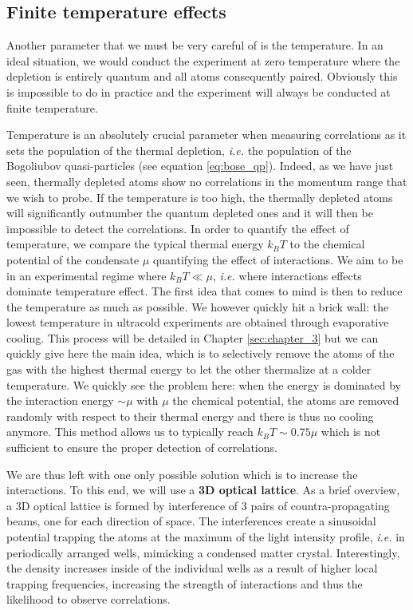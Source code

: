\subsection{Finite temperature effects}

Another parameter that we must be very careful of is the temperature. In an ideal situation, we would conduct the experiment at zero temperature where the depletion is entirely quantum and all atoms consequently \kmk paired. Obviously this is impossible to do in practice and the experiment will always be conducted at finite temperature.

Temperature is an absolutely crucial parameter when measuring \kmk correlations as it sets the population of the thermal depletion, {\it i.e.} the population of the Bogoliubov quasi-particles (see equation \ref{eq:bose_qp}). Indeed, as we have just seen, thermally depleted atoms show no \kmk correlations in the momentum range that we wish to probe. If the temperature is too high, the thermally depleted atoms will significantly outnumber the quantum depleted ones and it will then be impossible to detect the \kmk correlations. In order to quantify the effect of temperature, we compare the typical thermal energy $k_B T$ to the chemical potential of the condensate $\mu$ quantifying the effect of interactions. We aim to be in an experimental regime where $k_B T \ll \mu$, {\it i.e.} where interactions effects dominate temperature effect. The first idea that comes to mind is then to reduce the temperature as much as possible. We however quickly hit a brick wall: the lowest temperature in ultracold experiments are obtained through evaporative cooling. This process will be detailed in Chapter \ref{sec:chapter_3} but we can quickly give here the main idea, which is to selectively remove the atoms of the gas with the highest thermal energy to let the other thermalize at a colder temperature. We quickly see the problem here: when the energy is dominated by the interaction energy $\sim \mu$ with $\mu$ the chemical potential, the atoms are removed randomly with respect to their thermal energy and there is thus no cooling anymore. This method allows us to typically reach $k_B T \sim 0.75 \mu$ \cite{chang2016} which is not sufficient to ensure the proper detection of \kmk correlations.

We are thus left with one only possible solution which is to increase the interactions. To this end, we will use a \textbf{3D optical lattice}. As a brief overview, a 3D optical lattice is formed by interference of 3 pairs of countra-propagating beams, one for each direction of space. The interferences create a sinusoidal potential trapping the atoms at the maximum of the light intensity profile, {\it i.e.} in periodically arranged wells, mimicking a condensed matter crystal. Interestingly, the density increases inside of the individual wells as a result of higher local trapping frequencies, increasing the strength of interactions and thus the likelihood to observe \kmk correlations.




